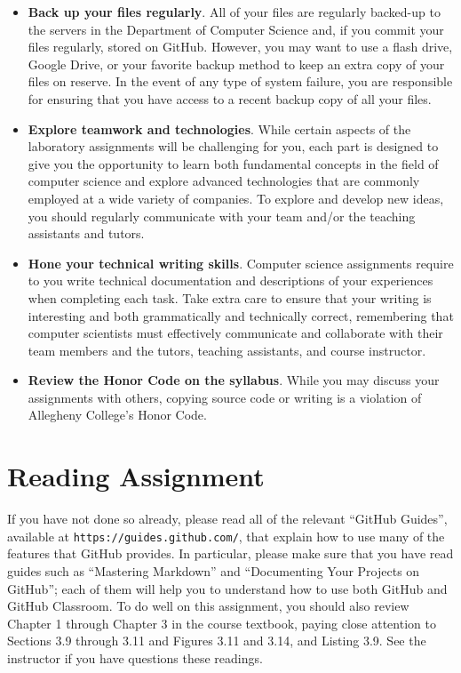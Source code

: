 \documentclass[11pt]{article}
\newcommand{\url}[1]{\lstinline{#1}}
\begin{document}
\begin{itemize}
\item {\bf Back up your files regularly}. All of your files are regularly
  backed-up to the servers in the Department of Computer Science and, if you
  commit your files regularly, stored on GitHub. However, you may want to use a
  flash drive, Google Drive, or your favorite backup method to keep an extra
  copy of your files on reserve. In the event of any type of system failure, you
  are responsible for ensuring that you have access to a recent backup copy of
  all your files.

\item {\bf Explore teamwork and technologies}. While certain aspects of the
  laboratory assignments will be challenging for you, each part is designed to
  give you the opportunity to learn both fundamental concepts in the field of
  computer science and explore advanced technologies that are commonly employed
  at a wide variety of companies. To explore and develop new ideas, you should
  regularly communicate with your team and/or the teaching assistants and
  tutors.

\item {\bf Hone your technical writing skills}. Computer science assignments
  require to you write technical documentation and descriptions of your
  experiences when completing each task. Take extra care to ensure that your
  writing is interesting and both grammatically and technically correct,
  remembering that computer scientists must effectively communicate and
  collaborate with their team members and the tutors, teaching assistants, and
  course instructor.

\item {\bf Review the Honor Code on the syllabus}. While you may discuss your
  assignments with others, copying source code or writing is a violation of
  Allegheny College's Honor Code.

\end{itemize}

\section*{Reading Assignment}

If you have not done so already, please read all of the relevant ``GitHub
Guides'', available at \url{https://guides.github.com/}, that explain how to use
many of the features that GitHub provides. In particular, please make sure that
you have read guides such as ``Mastering Markdown'' and ``Documenting Your
Projects on GitHub''; each of them will help you to understand how to use both
GitHub and GitHub Classroom. To do well on this assignment, you should also
review Chapter 1 through Chapter 3 in the course textbook, paying close
attention to Sections 3.9 through 3.11 and Figures 3.11 and 3.14, and Listing
3.9. See the instructor if you have questions these readings.
\end{document}
